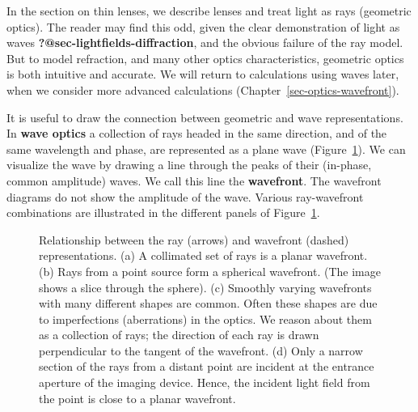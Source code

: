 \documentclass[
  letterpaper,
]{book}
\begin{document}
In the section on thin lenses, we describe lenses and treat light as
rays (geometric optics). The reader may find this odd, given the clear
demonstration of light as waves \textbf{?@sec-lightfields-diffraction},
and the obvious failure of the ray model. But to model refraction, and
many other optics characteristics, geometric optics is both intuitive
and accurate. We will return to calculations using waves later, when we
consider more advanced calculations
(Chapter~\ref{sec-optics-wavefront}).

It is useful to draw the connection between geometric and wave
representations. In \textbf{wave optics} a collection of rays headed in
the same direction, and of the same wavelength and phase, are
represented as a plane wave (Figure~\ref{fig-waves-rays}). We can
visualize the wave by drawing a line through the peaks of their
(in-phase, common amplitude) waves. We call this line the
\textbf{wavefront}. The wavefront diagrams do not show the amplitude of
the wave. Various ray-wavefront combinations are illustrated in the
different panels of Figure~\ref{fig-waves-rays}.

\begin{figure}


\caption{\label{fig-waves-rays}Relationship between the ray (arrows) and
wavefront (dashed) representations. (a) A collimated set of rays is a
planar wavefront. (b) Rays from a point source form a spherical
wavefront. (The image shows a slice through the sphere). (c) Smoothly
varying wavefronts with many different shapes are common. Often these
shapes are due to imperfections (aberrations) in the optics. We reason
about them as a collection of rays; the direction of each ray is drawn
perpendicular to the tangent of the wavefront. (d) Only a narrow section
of the rays from a distant point are incident at the entrance aperture
of the imaging device. Hence, the incident light field from the point is
close to a planar wavefront.}

\end{figure}%
\end{document}
